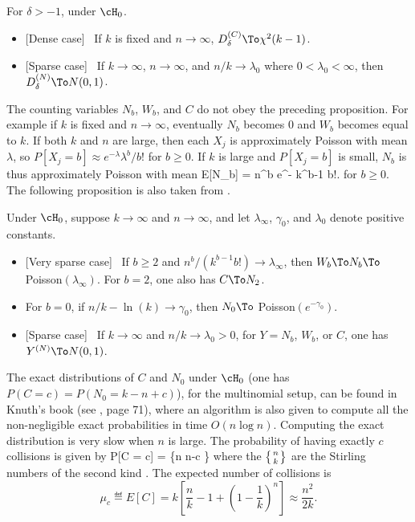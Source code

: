 \begin {proposition}
\label {prop1}
For $\delta > -1$, under $\cH_0$.
\begin {itemize}
\item[{\rm (i)}]
{\rm [Dense case]} \
If $k$ is fixed and $n\to\infty$, $D_{\delta}^{(C)} \To \chi^2(k-1)$.
%
\item[{\rm (ii)}]
{\rm [Sparse case]} \
If $k\to\infty$, $n\to\infty$, and $n/k \to\lambda_0$ where
$0<\lambda_0<\infty$, then $D_{\delta}^{(N)} \To N(0,1)$.
\end {itemize}
\end {proposition}

The counting variables $N_b$, $W_b$, and $C$ do not obey the
preceding proposition.
For example if $k$ is fixed and $n\to\infty$, eventually $N_b$ becomes
0 and $W_b$ becomes equal to $k$.
If both $k$ and $n$ are large, then each $X_j$ is approximately 
Poisson with mean $\lambda$, 
so $P[X_j = b] \approx e^{-\lambda} \lambda^b/b!$ for $b\ge 0$.
If $k$ is large and $P[X_j=b]$ is small, $N_b$ is thus approximately
Poisson with mean
\eq
  E[N_b] = {n^b e^{-\lambda} \over k^{b-1} b!}.
                                                         \label{eq:ENb}
\endeq
for $b\ge 0$.  The following proposition is also taken from \cite{rLEC02c}.

\begin {proposition}
\label {prop2}
Under $\cH_0$, suppose $k\to\infty$ and $n\to\infty$, 
and let $\lambda_\infty$,
$\gamma_0$, and $\lambda_0$ denote positive constants.
\begin {itemize}
\item[{\rm (i)}]
{\rm [Very sparse case]} \
If $b \ge 2$ and $n^b / (k^{b-1} b!) \to \lambda_\infty$, then
$W_b \To N_b \To$ {\rm Poisson}$(\lambda_\infty)$.
For $b=2$, one also has $C \To N_2$.
%
\item[{\rm (ii)}]
For $b=0$, if $n/k - \ln(k) \to \gamma_0$, then
$N_0 \To$ {\rm Poisson}$(e^{-\gamma_0})$.
%
\item[{\rm (iii)}]
{\rm [Sparse case]} \
If $k\to\infty$ and $n/k \to\lambda_0 > 0$,
for $Y = N_b$, $W_b$, or $C$, one has $Y^{(N)} \To N(0,1)$.
\end {itemize}
\end {proposition}

 The exact distributions of $C$ and $N_0$ under $\cH_0$
 (one has $P(C = c) = P(N_0 = k-n+c)$), for the multinomial setup, 
 can be found in Knuth's book
 (see \cite {rKNU98a}, page 71), where an algorithm is also given to
  compute all the non-negligible exact probabilities in time $O(n\log n)$.
  Computing the exact distribution is very slow
  when $n$ is large.
  The probability of having exactly $c$ collisions is given by
  \eq
   P[C = c] =  
             \left\{{n \atop n-c }\right\}           
  \endeq
  where the $\left\{{n \atop k}\right\}$ are the Stirling numbers of
  the second kind \cite{iKNU97a}.
  The expected number of collisions is
  $$
    \mu_c \eqdef E[C] 
   = k \left[{\textstyle \frac n k - 1 + \left(1 - \frac1k\right)^n}\right]
   \approx \frac{n^2}{2k}.
  $$

